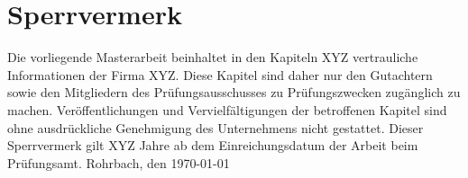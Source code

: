 \chapter*{Sperrvermerk}
Die vorliegende Masterarbeit beinhaltet in den Kapiteln XYZ vertrauliche Informationen der Firma XYZ. 
Diese Kapitel sind daher nur den Gutachtern sowie den Mitgliedern des Prüfungsausschusses zu Prüfungszwecken zugänglich zu machen. Veröffentlichungen und Vervielfältigungen der betroffenen Kapitel sind ohne ausdrückliche Genehmigung des Unternehmens nicht gestattet.
\medskip
Dieser Sperrvermerk gilt XYZ Jahre ab dem Einreichungsdatum der Arbeit beim Prüfungsamt.
\vspace{4cm}
\hfill Rohrbach, den \today \hrulefill